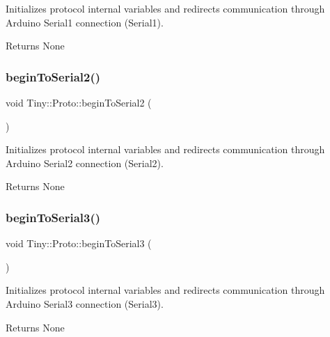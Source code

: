 Initializes protocol internal variables and redirects communication through Arduino Serial1 connection (Serial1). \begin{DoxyReturn}{Returns}
None 
\end{DoxyReturn}
\mbox{\label{classTiny_1_1Proto_a6d06cd3b1530e4986ce42a9987c522c4}} 
\subsubsection{\texorpdfstring{begin\+To\+Serial2()}{beginToSerial2()}}
{\footnotesize\ttfamily void Tiny\+::\+Proto\+::begin\+To\+Serial2 (\begin{DoxyParamCaption}{ }\end{DoxyParamCaption})\hspace{0.3cm}{\ttfamily [inline]}}

Initializes protocol internal variables and redirects communication through Arduino Serial2 connection (Serial2). \begin{DoxyReturn}{Returns}
None 
\end{DoxyReturn}
\mbox{\label{classTiny_1_1Proto_aedbc025e1534105134e4a2499d32207c}} 
\subsubsection{\texorpdfstring{begin\+To\+Serial3()}{beginToSerial3()}}
{\footnotesize\ttfamily void Tiny\+::\+Proto\+::begin\+To\+Serial3 (\begin{DoxyParamCaption}{ }\end{DoxyParamCaption})\hspace{0.3cm}{\ttfamily [inline]}}

Initializes protocol internal variables and redirects communication through Arduino Serial3 connection (Serial3). \begin{DoxyReturn}{Returns}
None 
\end{DoxyReturn}
\mbox{\label{classTiny_1_1Proto_a8992983d7ada115b0aa24db41594947c}} 
